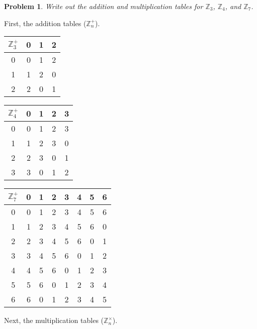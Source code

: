 \documentclass[12pt]{article}
\newenvironment{answer}
    {\begin{adjustwidth}{0pt}{0pt}}
    {\end{adjustwidth}}
\newtheorem{problem}{Problem}
\theoremstyle{remark}  %
\begin{document}
    \setcounter{problem}{0}
    \begin{problem}
        Write out the addition and multiplication tables for $\mathbb{Z}_3$, $\mathbb{Z}_4$, and $\mathbb{Z}_7$.
    \end{problem}
    \begin{answer}
        First, the addition tables ($\mathbb{Z}_n^+$).
        \begin{center}
            \begin{tabular}{c|ccc}
                $\mathbb{Z}_3^{+}$ & 0 & 1 & 2 \\
                \hline
                0 & 0 & 1 & 2 \\
                1 & 1 & 2 & 0 \\
                2 & 2 & 0 & 1
            \end{tabular}
            \hspace{5pt}
            \begin{tabular}{c|cccc}
                $\mathbb{Z}_4^{+}$ & 0 & 1 & 2 & 3 \\
                \hline
                0 & 0 & 1 & 2 & 3 \\
                1 & 1 & 2 & 3 & 0 \\
                2 & 2 & 3 & 0 & 1 \\ 
                3 & 3 & 0 & 1 & 2
            \end{tabular}
            \hspace{5pt}
            \begin{tabular}{c|ccccccc}
                $\mathbb{Z}_7^{+}$ & 0 & 1 & 2 & 3 & 4 & 5 & 6 \\
                \hline
                0 & 0 & 1 & 2 & 3 & 4 & 5 & 6 \\
                1 & 1 & 2 & 3 & 4 & 5 & 6 & 0 \\
                2 & 2 & 3 & 4 & 5 & 6 & 0 & 1 \\ 
                3 & 3 & 4 & 5 & 6 & 0 & 1 & 2 \\
                4 & 4 & 5 & 6 & 0 & 1 & 2 & 3 \\
                5 & 5 & 6 & 0 & 1 & 2 & 3 & 4 \\
                6 & 6 & 0 & 1 & 2 & 3 & 4 & 5
            \end{tabular}
        \end{center}
        Next, the multiplication tables ($\mathbb{Z}_n^\times$).

\end{answer}
\end{document}
